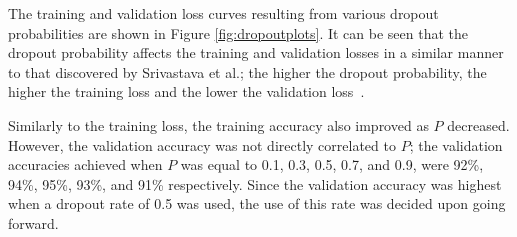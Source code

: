 The training and validation loss curves resulting from various dropout probabilities are shown in Figure \ref{fig:dropoutplots}. It can be seen that the dropout probability affects the training and validation losses in a similar manner to that discovered by Srivastava et al.; the higher the dropout probability, the higher the training loss and the lower the validation loss~\cite{dropout}.

Similarly to the training loss, the training accuracy also improved as $P$ decreased. However, the validation accuracy was not directly correlated to $P$; the validation accuracies achieved when $P$ was equal to 0.1, 0.3, 0.5, 0.7, and 0.9, were 92\%, 94\%, 95\%, 93\%, and 91\% respectively. Since the validation accuracy was highest when a dropout rate of 0.5 was used, the use of this rate was decided upon going forward.

